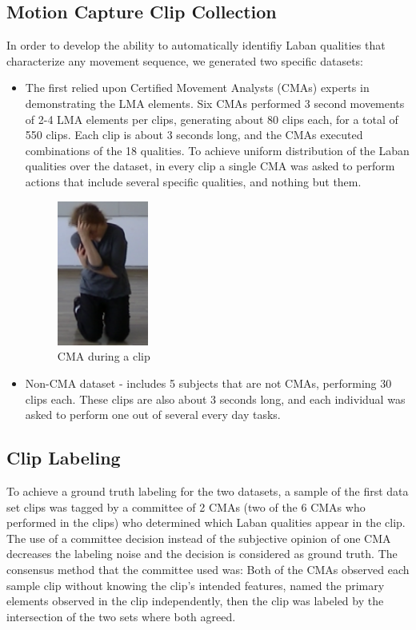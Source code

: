 \documentclass{sigchi}
\begin{document}
\subsection{Motion Capture Clip Collection}
In order to develop the ability to automatically identifiy Laban qualities that characterize any movement sequence, we generated two specific datasets:
\begin{itemize}
  \item
  The first relied upon Certified Movement Analysts (CMAs) experts in demonstrating the LMA elements. Six CMAs performed 3 second movements of 2-4 LMA elements per clips, generating about 80 clips each, for a total of 550 clips.  Each clip is about 3 seconds long, and the CMAs executed combinations of the 18 qualities.
  To achieve uniform distribution of the Laban qualities over the dataset, in every
  clip a single CMA was asked to perform actions that include several specific qualities,
  and nothing but them.
  
  \begin{figure}[h]
\centering
\includegraphics[width=30mm]{Rachelle.png}
\caption{CMA during a clip}
\label{Rachelle}
\end{figure}

\item
Non-CMA dataset - includes 5 subjects that are not CMAs, performing 30 clips each. 
These clips are also about 3 seconds long, and each individual was asked to perform one out 
of several every day tasks.
\end{itemize}
\subsection{Clip Labeling}
To achieve a ground truth labeling for the two datasets, 
a sample of the first data set clips was tagged by a committee of 2 CMAs 
(two of the 6 CMAs who performed in the clips) who determined 
which Laban qualities appear in the clip. The use of a committee 
decision instead of the subjective opinion of one CMA decreases 
the labeling noise and the decision is considered as ground truth. 
The consensus method that the committee used was: Both of the CMAs 
observed each sample clip without knowing the clip's intended features, 
named the primary elements observed in the clip independently, 
then the clip was labeled by the intersection of the two sets where both agreed. 
\end{document}
